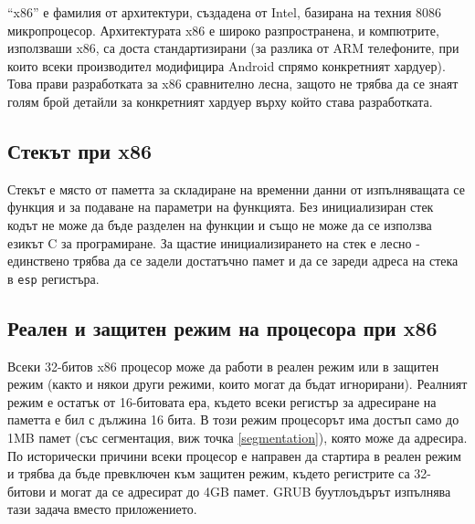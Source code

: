   ``x86'' е фамилия от архитектури, създадена от Intel, базирана на техния 8086 микропроцесор. Архитектурата x86 е широко разпространена, и компютрите, използваши x86, са доста стандартизирани (за разлика от ARM телефоните, при които всеки производител модифицира Android спрямо конкретният хардуер). Това прави разработката за x86 сравнително лесна, защото не трябва да се знаят голям брой детайли за конкретният хардуер върху който става разработката.


  \subsection{Стекът при x86}
  Стекът е място от паметта за складиране на временни данни от изпълняващата се функция и за подаване на параметри на функцията. Без инициализиран стек кодът не може да бъде разделен на функции и също не може да се използва езикът C за програмиране. За щастие инициализирането на стек е лесно - единствено трябва да се задели достатъчно памет и да се зареди адреса на стека в {\tt esp} регистъра.

  \subsection{Реален и защитен режим на процесора при x86} \label{processormodes}
  Всеки 32-битов x86 процесор може да работи в реален режим или в защитен режим (както и някои други режими, които могат да бъдат игнорирани). Реалният режим е остатък от 16-битовата ера, където всеки регистър за адресиране на паметта е бил с дължина 16 бита. В този режим процесорът има достъп само до 1MB памет (със сегментация, виж точка \ref{segmentation}), която може да адресира. По исторически причини всеки процесор е направен да стартира в реален режим и трябва да бъде превключен към защитен режим, където регистрите са 32-битови и могат да се адресират до 4GB памет. GRUB буутлоъдърът изпълнява тази задача вместо приложението.

